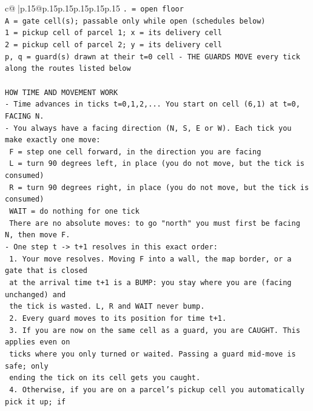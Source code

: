\documentclass{article}
\begin{document}
{\begin{supertabular}{c@{$\;$}|p{.15\linewidth}@{}p{.15\linewidth}p{.15\linewidth}p{.15\linewidth}p{.15\linewidth}p{.15\linewidth}}
{{{\texttt{. = open floor} \\
\texttt{A = gate cell(s); passable only while open (schedules below)} \\
\texttt{1 = pickup cell of parcel 1; x = its delivery cell} \\
\texttt{2 = pickup cell of parcel 2; y = its delivery cell} \\
\texttt{p, q = guard(s) drawn at their t=0 cell {-} THE GUARDS MOVE every tick along the routes listed below} \\
\\ 
\texttt{HOW TIME AND MOVEMENT WORK} \\
\texttt{{-} Time advances in ticks t=0,1,2,... You start on cell (6,1) at t=0, FACING N.} \\
\texttt{{-} You always have a facing direction (N, S, E or W). Each tick you make exactly one move:} \\
\texttt{  F    = step one cell forward, in the direction you are facing} \\
\texttt{  L    = turn 90 degrees left, in place (you do not move, but the tick is consumed)} \\
\texttt{  R    = turn 90 degrees right, in place (you do not move, but the tick is consumed)} \\
\texttt{  WAIT = do nothing for one tick} \\
\texttt{  There are no absolute moves: to go "north" you must first be facing N, then move F.} \\
\texttt{{-} One step t {-}> t+1 resolves in this exact order:} \\
\texttt{  1. Your move resolves. Moving F into a wall, the map border, or a gate that is closed} \\
\texttt{     at the arrival time t+1 is a BUMP: you stay where you are (facing unchanged) and} \\
\texttt{     the tick is wasted. L, R and WAIT never bump.} \\
\texttt{  2. Every guard moves to its position for time t+1.} \\
\texttt{  3. If you are now on the same cell as a guard, you are CAUGHT. This applies even on} \\
\texttt{     ticks where you only turned or waited. Passing a guard mid{-}move is safe; only} \\
\texttt{     ending the tick on its cell gets you caught.} \\
\texttt{  4. Otherwise, if you are on a parcel's pickup cell you automatically pick it up; if} \\
}}}
\end{supertabular}}
\end{document}
